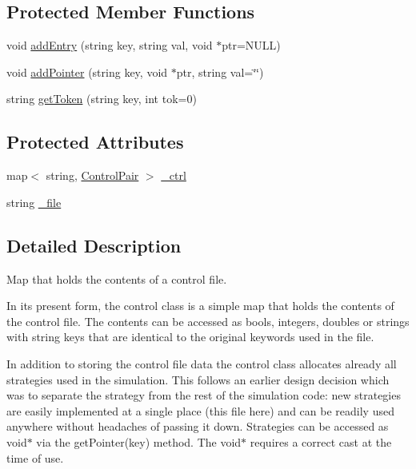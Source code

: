 \subsection*{Protected Member Functions}
\begin{DoxyCompactItemize}
\item 
void \hyperlink{class_control_a01104c38f1b71090108a52dcf0b3d1d8}{add\+Entry} (string key, string val, void $\ast$ptr=N\+U\+LL)
\item 
void \hyperlink{class_control_ab2764922690cecd881f3ac9c1e0ba8d6}{add\+Pointer} (string key, void $\ast$ptr, string val=\char`\"{}\char`\"{})
\item 
string \hyperlink{class_control_a194c1ebfe1f3774f2fc966b2c9d240b6}{get\+Token} (string key, int tok=0)
\end{DoxyCompactItemize}
\subsection*{Protected Attributes}
\begin{DoxyCompactItemize}
\item 
map$<$ string, \hyperlink{struct_control_1_1_control_pair}{Control\+Pair} $>$ \hyperlink{class_control_a95f5fb38688937d485753cb4d67b4099}{\+\_\+ctrl}
\item 
string \hyperlink{class_control_a9eb8605f3cba35efc0b6b76d38e9fd25}{\+\_\+file}
\end{DoxyCompactItemize}


\subsection{Detailed Description}
Map that holds the contents of a control file. 

In its present form, the control class is a simple map that holds the contents of the control file. The contents can be accessed as bools, integers, doubles or strings with string keys that are identical to the original keywords used in the file.

In addition to storing the control file data the control class allocates already all strategies used in the simulation. This follows an earlier design decision which was to separate the strategy from the rest of the simulation code\+: new strategies are easily implemented at a single place (this file here) and can be readily used anywhere without headaches of passing it down. Strategies can be accessed as void$\ast$ via the get\+Pointer(key) method. The void$\ast$ requires a correct cast at the time of use.

